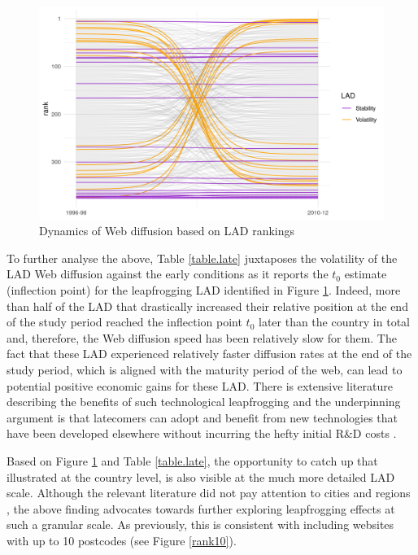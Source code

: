 \documentclass[
  authoryear,
  preprint,
  3p]{elsarticle}
\begin{document}
\begin{figure}[H]

{\centering \includegraphics[width=1\textwidth,height=\textheight]{../../outputs/ranks/web_per_firm2000_2012_only0595_av.png}

}

\caption{\label{rank}Dynamics of Web diffusion based on LAD rankings}

\end{figure}%

To further analyse the above, Table \ref{table.late} juxtaposes the
volatility of the LAD Web diffusion against the early conditions as it
reports the \(t_0\) estimate (inflection point) for the leapfrogging LAD
identified in Figure \ref{rank}. Indeed, more than half of the LAD that
drastically increased their relative position at the end of the study
period reached the inflection point \(t_0\) later than the country in
total and, therefore, the Web diffusion speed has been relatively slow
for them. The fact that these LAD experienced relatively faster
diffusion rates at the end of the study period, which is aligned with
the maturity period of the web, can lead to potential positive economic
gains for these LAD. There is extensive literature describing the
benefits of such technological leapfrogging and the underpinning
argument is that latecomers can adopt and benefit from new technologies
that have been developed elsewhere without incurring the hefty initial
R\&D costs \citep{teece2008firm}.

Based on Figure \ref{rank} and Table \ref{table.late}, the opportunity
to catch up that \citet{perkins2005international} illustrated at the
country level, is also visible at the much more detailed LAD scale.
Although the relevant literature did not pay attention to cities and
regions \citep{yu2018sustainability}, the above finding advocates
towards further exploring leapfrogging effects at such a granular scale.
As previously, this is consistent with including websites with up to 10
postcodes (see Figure \ref{rank10}).
\end{document}
